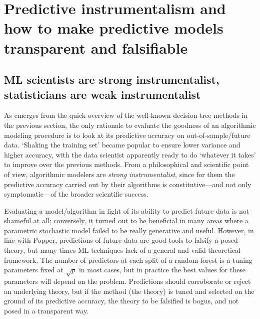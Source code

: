 \documentclass{statsoc}
\begin{document}
%
%
%
%
%

\color{black}

\section{Predictive instrumentalism and  how to make predictive models transparent and falsifiable}
\label{sec:instr}

\subsection{ML scientists are strong instrumentalist, statisticians are weak instrumentalist}

As emerges from the quick overview of the well-known decision tree methods in the previous section, the only rationale to evaluate the goodness of an algorithmic modeling procedure is to look at its 
predictive accuracy on out-of-sample/future data. `Shaking the training set' became popular to ensure lower variance and higher accuracy, with the data scientist apparently ready to 
do `whatever it takes' to improve over the previous methods. From a philosophical and scientific point of view, algorithmic modelers are \emph{strong instrumentalist}, since for 
them the predictive accuracy carried out by their algorithms is constitutive---and not only symptomatic---of the broader scientific success.

Evaluating a model/algorithm in light of its ability to predict future data is not shameful at all; conversely, it turned out to be beneficial in many areas where a parametric 
stochastic model failed to be really generative and useful. However, in line with Popper, predictions of future data are good tools to falsify a posed theory, but many times ML 
techniques lack of a general and valid theoretical framework. The number of predictors at each split of a random forest is a tuning parameters fixed at $\sqrt{p}$ in most cases, but 
in practice the best values for these parameters will depend on the problem. Predictions should corroborate or reject an underlying theory, but if the method (the theory) is tuned 
and selected on the ground of its predictive accuracy, the theory to be falsified is bogus, and not posed in a transparent way.
\end{document}
